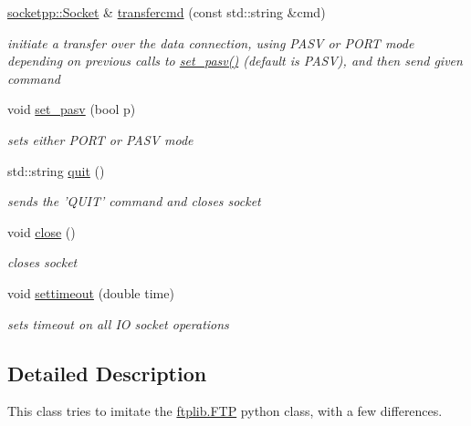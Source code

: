 \begin{CompactItemize}
\hyperlink{classsocketpp_1_1Socket}{socketpp::Socket} \& \hyperlink{classftplib_1_1FTP_c949b3cd7b92534705ff041bb43d989b}{transfercmd} (const std::string \&cmd)
\begin{CompactList}\small\item\em initiate a transfer over the data connection, using PASV or PORT mode depending on previous calls to \hyperlink{classftplib_1_1FTP_e35230239f093f01fb295ccb007de1b2}{set\_\-pasv()} (default is PASV), and then send given command \item\end{CompactList}\item 
void \hyperlink{classftplib_1_1FTP_e35230239f093f01fb295ccb007de1b2}{set\_\-pasv} (bool p)
\begin{CompactList}\small\item\em sets either PORT or PASV mode \item\end{CompactList}\item 
std::string \hyperlink{classftplib_1_1FTP_bd6e018a5cc17b1c8007064830823c71}{quit} ()
\begin{CompactList}\small\item\em sends the 'QUIT' command and closes socket \item\end{CompactList}\item 
void \hyperlink{classftplib_1_1FTP_4f36be9f23721435f19a7e5b1d702718}{close} ()
\begin{CompactList}\small\item\em closes socket \item\end{CompactList}\item 
void \hyperlink{classftplib_1_1FTP_a6603cda3b7c44c48c6a2b8d688d3bb7}{settimeout} (double time)
\begin{CompactList}\small\item\em sets timeout on all IO socket operations \item\end{CompactList}\end{CompactItemize}


\subsection{Detailed Description}
This class tries to imitate the \hyperlink{classftplib_1_1FTP}{ftplib.FTP} python class, with a few differences. 

